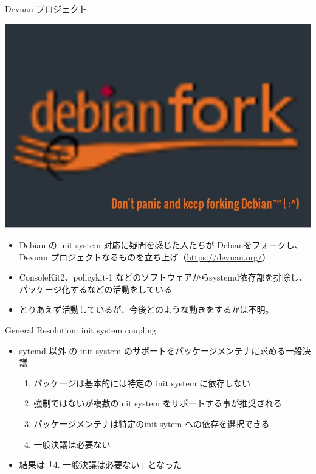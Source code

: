 \begin{frame}{Devuan プロジェクト}

\begin{center}
\includegraphics[scale=0.2]{image201502/devuan.jpg}
\end{center}

\begin{itemize}
\item Debian の init system 対応に疑問を感じた人たちが Debianをフォークし、Devuan
プロジェクトなるものを立ち上げ（\url{https://devuan.org/}）
\item ConsoleKit2、policykit-1 などのソフトウェアからsystemd依存部を排除し、パッケージ化するなどの活動をしている
\item とりあえず活動しているが、今後どのような動きをするかは不明。
\end{itemize}

\end{frame}

\begin{frame}{General Resolution: init system coupling}

\begin{itemize}
\item sytemd 以外 の init system のサポートをパッケージメンテナに求める一般決議
\begin{enumerate}
\item パッケージは基本的には特定の init system に依存しない
\item 強制ではないが複数のinit system をサポートする事が推奨される
\item パッケージメンテナは特定のinit sytem への依存を選択できる
\item 一般決議は必要ない
\end{enumerate}
\item 結果は「4. 一般決議は必要ない」となった 

\end{itemize}

\end{frame}

